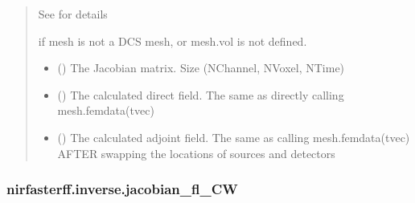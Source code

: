\documentclass[letterpaper,10pt,english]{sphinxmanual}
\begin{document}
\begin{fulllineitems}
\begin{quote}
\begin{description}
\begin{itemize}
\sphinxAtStartPar
See {\hyperref[\detokenize{_autosummary/nirfasterff.utils.SolverOptions:nirfasterff.utils.SolverOptions}]{}} for details


\end{itemize}

\sphinxAtStartPar
{} \textendash{} if mesh is not a DCS mesh, or mesh.vol is not defined.

\sphinxAtStartPar
\begin{itemize}
\item {} 
\sphinxAtStartPar
{} () \textendash{} The Jacobian matrix. Size (NChannel, NVoxel, NTime)

\item {} 
\sphinxAtStartPar
{} () \textendash{} The calculated direct field. The same as directly calling mesh.femdata(tvec)

\item {} 
\sphinxAtStartPar
{} () \textendash{} The calculated adjoint field. The same as calling mesh.femdata(tvec) AFTER swapping the locations of sources and detectors

\end{itemize}


\end{description}\end{quote}

\end{fulllineitems}


\sphinxstepscope


\subsubsection{nirfasterff.inverse.jacobian\_fl\_CW}
\label{\detokenize{_autosummary/nirfasterff.inverse.jacobian_fl_CW:nirfasterff-inverse-jacobian-fl-cw}}\label{\detokenize{_autosummary/nirfasterff.inverse.jacobian_fl_CW::doc}}
\end{document}
